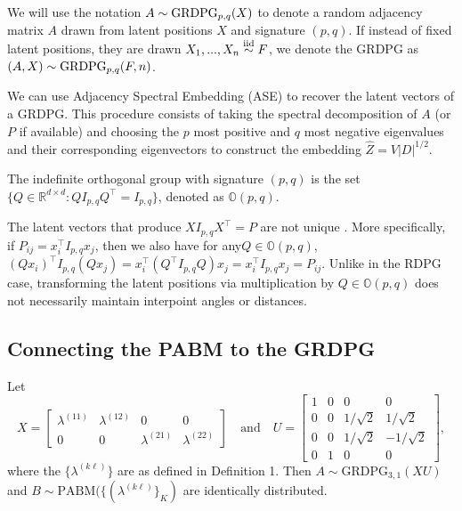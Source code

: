 \documentclass[12pt]{article}
\begin{document}
We will use the notation \(A \sim \mathrm{GRDPG}_{p,q}(X)\) to denote a random
adjacency matrix \(A\) drawn from latent positions \(X\) and signature
\((p, q)\). If instead of fixed latent positions, 
they are drawn $X_1, ..., X_n \stackrel{\mathrm{iid}}{\sim} F$, 
we denote the GRDPG as $(A, X) \sim \mathrm{GRDPG}_{p,q}(F, n)$.

\begin{remark}
We can use Adjacency Spectral Embedding (ASE) 
\cite{rubindelanchy2017statistical} to recover the latent vectors of a GRDPG. 
This procedure consists of taking the spectral decomposition of $A$ 
(or $P$ if available) and choosing the $p$ most positive and $q$ most negative
eigenvalues and their corresponding eigenvectors 
to construct the embedding $\hat{Z} = V |D|^{1/2}$. 
\end{remark}

\begin{definition}
The indefinite orthogonal group with signature $(p, q)$ is
the set $\{Q \in \mathbb{R}^{d \times d} : Q I_{p, q} Q^{\top} = I_{p, q}\}$,
denoted as $\mathbb{O}(p, q)$.
\end{definition}

\begin{remark}
The latent vectors that produce $X I_{p,q} X^\top = P$ are not unique
\cite{rubindelanchy2017statistical}.
More specifically, if $P_{ij} = x_i^\top I_{p, q} x_j$, 
then we also have for any$Q \in \mathbb{O}(p, q)$,
$(Q x_i)^\top I_{p, q} (Q x_j) = x_i^\top (Q^\top I_{p, q} Q) x_j =
x_i^\top I_{p, q} x_j = P_{ij}$.
Unlike in the RDPG case, transforming the latent positions via multiplication
by $Q \in \mathbb{O}(p, q)$ does not necessarily maintain interpoint angles or
distances.
\end{remark}

\hypertarget{connecting-the-pabm-to-the-grdpg}{%
\subsection{Connecting the PABM to the
GRDPG}\label{connecting-the-pabm-to-the-grdpg}}
\begin{proposition}[Connecting the PABM to the GRDPG for $K = 2$]
\label{theorem1}
Let
$$X = \begin{bmatrix}
\lambda^{(11)} & \lambda^{(12)} & 0 & 0 \\
0 & 0 & \lambda^{(21)} & \lambda^{(22)}
\end{bmatrix} \quad \text{and} \quad
U = \begin{bmatrix} 1 & 0 & 0 & 0 \\
0 & 0 & 1 / \sqrt{2} & 1 / \sqrt{2} \\
0 & 0 & 1 / \sqrt{2} & - 1 / \sqrt{2} \\
0 & 1 & 0 & 0 \end{bmatrix},$$
where the $\{\lambda^{(k \ell)}\}$ are as defined in Definition 1.
Then $A \sim \mathrm{GRDPG}_{3, 1}(X U)$ and 
$B \sim \mathrm{PABM}(\{(\lambda^{(k \ell)}\}_K)$ are
identically distributed.
\end{proposition}
\end{document}
